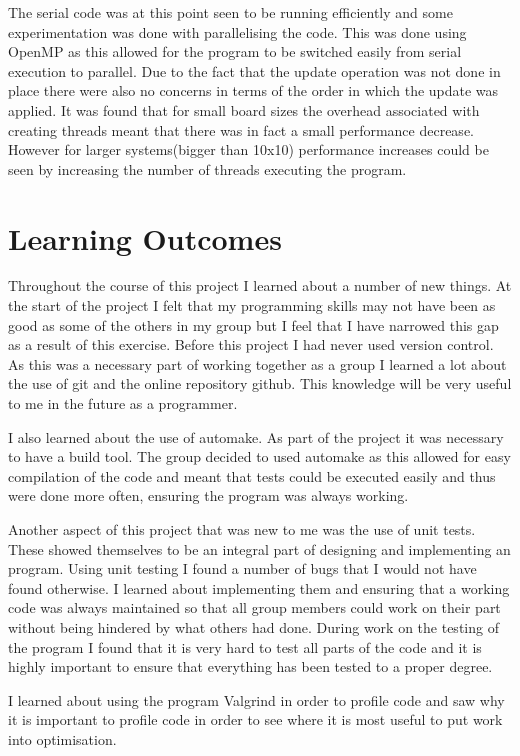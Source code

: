 \documentclass[12pt]{article}    %
\numberwithin{equation}{section}
\begin{document}
The serial code was at this point seen to be running efficiently and some experimentation was done with parallelising the code.
This was done using OpenMP as this allowed for the program to be switched easily from serial execution to parallel.
Due to the fact that the update operation was not done in place there were also no concerns in terms of the order in which the update was applied.
It was found that for small board sizes the overhead associated with creating threads meant that there was in fact a small performance decrease.
However for larger systems(bigger than 10x10) performance increases could be seen by increasing the number of threads executing the program.

\section{Learning Outcomes}
Throughout the course of this project I learned about a number of new things.
At the start of the project I felt that my programming skills may not have been as good as some of the others in my group but I feel that I have narrowed this gap as a result of this exercise.
Before this project I had never used version control.
As this was a necessary part of working together as a group I learned a lot about the use of git and the online repository github.
This knowledge will be very useful to me in the future as a programmer.

I also learned about the use of automake.
As part of the project it was necessary to have a build tool.
The group decided to used automake as this allowed for easy compilation of the code and meant that tests could be executed easily and thus were done more often, ensuring the program was always working.

Another aspect of this project that was new to me was the use of unit tests.
These showed themselves to be an integral part of designing and implementing an program.
Using unit testing I found a number of bugs that I would not have found otherwise.
I learned about implementing them and ensuring that a working code was always maintained so that all group members could work on their part without being hindered by what others had done.
During work on the testing of the program I found that it is very hard to test all parts of the code and it is highly important to ensure that everything has been tested to a proper degree.

I learned about using the program Valgrind in order to profile code and saw why it is important to profile code in order to see where it is most useful to put work into optimisation.
\end{document}
